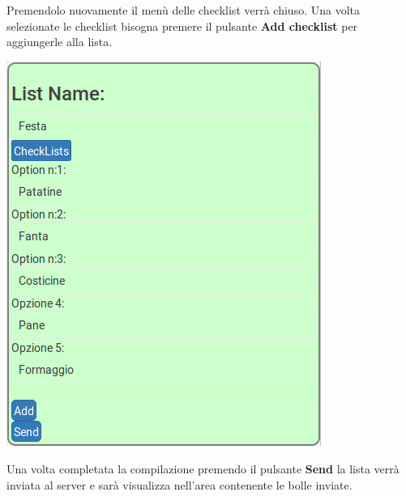 \begin{flushleft}
Premendolo nuovamente il menù delle checklist verrà chiuso.
Una volta selezionate le checklist bisogna premere il pulsante \textbf{Add checklist} per aggiungerle alla lista.\\
\begin{center}
\includegraphics[scale=0.75]{img/list_checklist2.png}
\end{center}

Una volta completata la compilazione premendo il pulsante \textbf{Send} la lista verrà inviata al server e sarà visualizza nell'area contenente le bolle inviate.

\end{flushleft}
